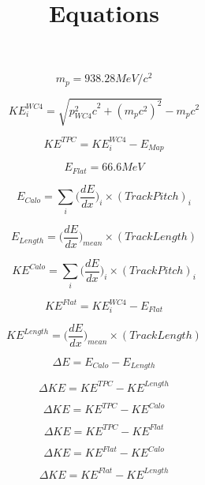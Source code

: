 \documentclass[11pt]{article}
\title{Equations}
\begin{document}
\begin{equation}
m_{p} = 938.28 MeV/c^{2}
\end{equation}

\begin{equation}
KE_{i}^{WC4} = \sqrt{{p_{WC4}^{2}c}^{2} + (m_{p}c^{2})^{2}} - m_{p}c^{2}
\end{equation}

\begin{equation}
KE^{TPC} = KE_{i}^{WC4} - E_{Map}
\end{equation}

\begin{equation}
E_{Flat} = 66.6 MeV
\end{equation}

\begin{equation}
E_{Calo} = \sum_{i} \Big(\frac{dE}{dx}\Big)_{i} \times (Track Pitch)_{i}
\end{equation}

\begin{equation}
E_{Length} = \Big(\frac{dE}{dx}\Big)_{mean} \times (Track Length)
\end{equation}

\begin{equation}
KE^{Calo} = \sum_{i} \Big(\frac{dE}{dx}\Big)_{i} \times (Track Pitch)_{i}
\end{equation}

\begin{equation}
KE^{Flat} = KE^{WC4}_{i} - E_{Flat}
\end{equation}

\begin{equation}
KE^{Length} = \Big(\frac{dE}{dx}\Big)_{mean} \times (Track Length)
\end{equation}

\begin{equation}
\Delta{E} = E_{Calo} - E_{Length}
\end{equation}

\begin{equation}
\Delta{KE} = KE^{TPC} - KE^{Length}
\end{equation}

\begin{equation}
\Delta{KE} = KE^{TPC} - KE^{Calo}
\end{equation}

\begin{equation}
\Delta{KE} = KE^{TPC} - KE^{Flat}
\end{equation}

\begin{equation}
\Delta{KE} = KE^{Flat} - KE^{Calo}
\end{equation}

\begin{equation}
\Delta{KE} = KE^{Flat} - KE^{Length}
\end{equation}
\end{document}
